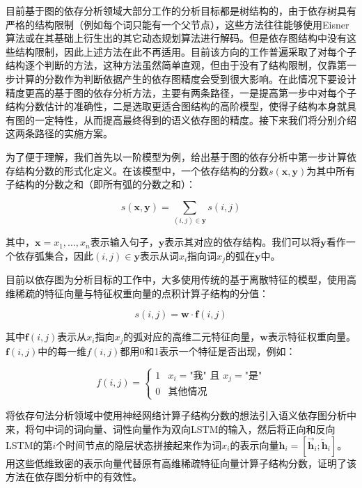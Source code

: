 目前基于图的依存分析领域大部分工作的分析目标都是树结构的，由于依存树具有严格的结构限制（例如每个词只能有一个父节点），这些方法往往能够使用Eisner算法或在其基础上衍生出的其它动态规划算法进行解码。但是依存图结构中没有这些结构限制，因此上述方法在此不再适用。目前该方向的工作普遍采取了对每个子结构逐个判断的方法，这种方法虽然简单直观，但由于没有了结构限制，仅靠第一步计算的分数作为判断依据产生的依存图精度会受到很大影响。在此情况下要设计精度更高的基于图的依存分析方法，主要有两条路径，一是提高第一步中对每个子结构分数估计的准确性，二是选取更适合图结构的高阶模型，使得子结构本身就具有图的一定特性，从而提高最终得到的语义依存图的精度。接下来我们将分别介绍这两条路径的实施方案。

为了便于理解，我们首先以一阶模型为例，给出基于图的依存分析中第一步计算依存结构分数的形式化定义。在该模型中，一个依存结构的分数$s(\boldsymbol{x},\boldsymbol{y})$为其中所有子结构的分数之和（即所有弧的分数之和）：

\begin{equation}
s(\boldsymbol{x},\boldsymbol{y})=\sum_{(i,j) \in \boldsymbol{y}} s(i,j)
\end{equation}

其中，$\boldsymbol{x}=x_1,\dots,x_n$表示输入句子，$\boldsymbol{y}$表示其对应的依存结构。我们可以将$\boldsymbol{y}$看作一个依存弧集合，因此$(i,j) \in \boldsymbol{y}$表示从词$x_i$指向词$x_j$的弧在$\boldsymbol{y}$中。

目前以依存图为分析目标的工作中，大多使用传统的基于离散特征的模型，使用高维稀疏的特征向量与特征权重向量的点积计算子结构的分值：

\begin{equation}
s(i,j) = \mathbf{w} \cdot \mathbf{f}(i,j)
\end{equation}

其中$\mathbf{f}(i,j)$表示从$x_i$指向$x_j$的弧对应的高维二元特征向量，$\mathbf{w}$表示特征权重向量。$\mathbf{f}(i,j)$中的每一维$f(i,j)$都用0和1表示一个特征是否出现，例如：

\begin{equation}
f(i,j)=
\begin{cases}
1& x_i = \text{"我" 且\ } x_j = \text{"是"} \\
0& \text{其他情况}
\end{cases}
\end{equation}

将依存句法分析领域中使用神经网络计算子结构分数的想法引入语义依存图分析中来，将句中词的词向量、词性向量作为双向LSTM的输入，然后将正向和反向LSTM的第$i$个时间节点的隐层状态拼接起来作为词$x_i$的表示向量$\mathbf{h}_i=[\overrightarrow{\mathbf{h}}_i;\overleftarrow{\mathbf{h}}_i]$。用这些低维致密的表示向量代替原有高维稀疏特征向量计算子结构分数，证明了该方法在依存图分析中的有效性。

